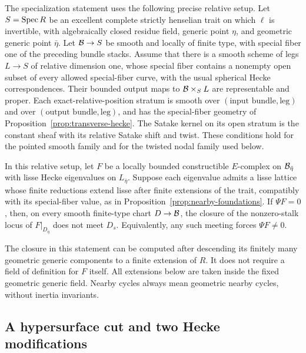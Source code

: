 The specialization statement uses the following precise relative setup.
Let $S=\operatorname{Spec} R$ be an excellent complete strictly henselian trait on which
$\ell$ is invertible, with
algebraically closed residue field, generic point $\eta$, and geometric
generic point $\bar\eta$.  Let $\mathcal B\to S$ be smooth and locally of finite
type, with special fiber one of the preceding bundle stacks.  Assume that
there is a smooth scheme of legs $L\to S$ of relative dimension one,
whose special fiber contains a nonempty open subset of every allowed
special-fiber curve, with the usual
spherical Hecke correspondences.  Their bounded output maps to
$\mathcal B\times_S L$ are representable and proper.  Each exact-relative-position
stratum is smooth over $(\text{input bundle},\text{leg})$ and over
$(\text{output bundle},\text{leg})$, and has the special-fiber geometry of
Proposition~\ref{prop:transverse-hecke}.  The Satake kernel on its open
stratum is the constant sheaf with its relative Satake shift and twist.
These conditions hold for the pointed smooth family and for the twisted
nodal family used below.

\begin{theorem}\label{thm:specialization-detection}
In this relative setup, let $F$ be a locally bounded constructible
$E$-complex on $\mathcal B_{\bar\eta}$ with lisse Hecke eigenvalues on
$L_{\bar\eta}$.  Suppose each eigenvalue admits a lisse lattice whose
finite reductions extend lisse after finite extensions of the trait,
compatibly with its special-fiber value, as in
Proposition~\ref{prop:nearby-foundations}.  If $\Psi F=0$, then, on every
smooth finite-type chart $D\to\mathcal B$, the closure of the nonzero-stalk locus
of $F|_{D_{\bar\eta}}$ does not meet $D_s$.
Equivalently, any such meeting forces $\Psi F\ne0$.
\end{theorem}

The closure in this statement can be computed after descending its finitely
many geometric generic components to a finite extension of $R$.  It does
not require a field of definition for $F$ itself.  All extensions below are
taken inside the fixed geometric generic field.  Nearby cycles always mean
geometric nearby cycles, without inertia invariants.

\subsection{A hypersurface cut and two Hecke modifications}

